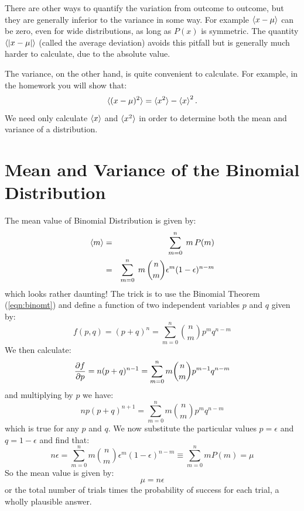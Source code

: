 \documentclass[12pt,oneside]{book}
\begin{document}
There are other ways to quantify the variation from outcome to
outcome, but they are generally inferior to the variance in some way.
For example $\braket{x-\mu}$ can be zero, even for wide distributions,
as long as $P(x)$ is symmetric.  The quantity $\braket{|x-\mu|}$
(called the average deviation) avoids this pitfall but is generally
much harder to calculate, due to the absolute value.

The variance, on the other hand, is quite convenient to calculate.
For example, in the homework you will show that:
\begin{equation}
\label{eqn:varhw}
\braket{(x-\mu)^2} = \braket{x^2} -\braket{x}^2.
\end{equation}
We need only calculate $\braket{x}$ and $\braket{x^2}$ in order
to determine both the mean and variance of a distribution.

\section{Mean and Variance of the Binomial Distribution}

The mean value of Binomial Distribution is given by:
\begin{eqnarray*}
\braket{m} &=& \sum_{m=0}^n \; m \, P(m) \\
&=& \sum_{m=0}^n \; m \, \binom{n}{m} \epsilon^m (1-\epsilon)^{n-m} \\
\end{eqnarray*}
which looks rather daunting!  The trick is to use the Binomial Theorem (\ref{eqn:binomt}) and define a function of two independent variables $p$ and $q$ given by:
\begin{displaymath}
f(p,q) = (p+q)^n = \sum_{m=0}^n \binom{n}{m} p^m q^{n-m}
\end{displaymath}
We then calculate:
\begin{displaymath}
\frac{\partial f}{\partial p} = n(p+q)^{n-1} = \sum_{m=0}^n m \binom{n}{m} p^{m-1} q^{n-m} \\
\end{displaymath}
and multiplying by $p$ we have:
\begin{displaymath}
np(p+q)^{n+1} = \sum_{m=0}^n m \binom{n}{m} p^m q^{n-m}
\end{displaymath}
which is true for any $p$ and $q$.  We now substitute the particular values $p=\epsilon$ and $q=1-\epsilon$ and find that:
\begin{displaymath}
n \epsilon = \sum_{m=0}^n m \binom{n}{m} \epsilon^m (1-\epsilon)^{n-m} \equiv \sum_{m=0}^n m P(m) = \mu
\end{displaymath}
So the mean value is given by:
\begin{equation}
\mu = n \epsilon
\end{equation}
or the total number of trials times the probability of success for each trial, a wholly plausible answer.
\end{document}
